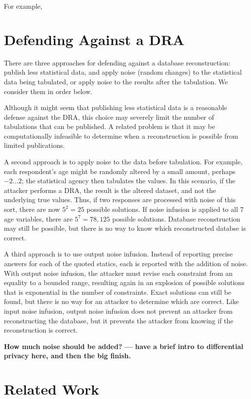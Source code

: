 \documentclass[runningheads]{llncs}
\begin{document}
For example, 


\section{Defending Against a DRA}\label{solution}
There are three approaches for defending against a database reconstruction: publish less
statistical data, and apply noise (random changes) to the
statistical data being tabulated, or apply noise to the results after
the tabulation. We consider them in order below.

Although it might seem that publishing less statistical data is a
reasonable defense against the DRA, this choice may severely limit the number
of tabulations that can be published. A
related problem is that it may be computationally infeasible to
determine when a reconstruction is possible from limited publications.

A second approach is to apply noise to the data before
tabulation. For example, each respondent's age might be randomly
altered by a small amount, perhaps $-2 \ldots 2$; 
the statistical agency then tabulates the values. 
In this scenario, if the attacker performs a DRA, the result is the altered dataset, and not the underlying true values. Thus, if two responses
are processed with noise of this sort, there are now $5^2 = 25$
possible solutions. If noise infusion is applied to all 7 age
variables, there are $5^{7}=78,125$ possible
solutions. Database reconstruction may still be possible, but there is no
way to know which reconstructed databse is correct. 

A third approach is to use output noise infusion. Instead of reporting
precise answers for each of the quoted statics, each is reported with
the addition of noise.  With output noise infusion, the attacker must
revise each constraint from an equality to a bounded range, resulting
again in an explosion of possible solutions that is exponential in the
number of constraints. Exact solutions can still be found, but there
is no way for an attacker to determine which are correct.  Like input
noise infusion, output noise infusion does not prevent an attacker
from reconstructing the database, but it prevents the attacker from
knowing if the reconstruction is correct.

\textbf{How much noise should be added? --- have a brief intro to
  differential privacy here, and then the big finish.}

\section{Related Work}
\end{document}
